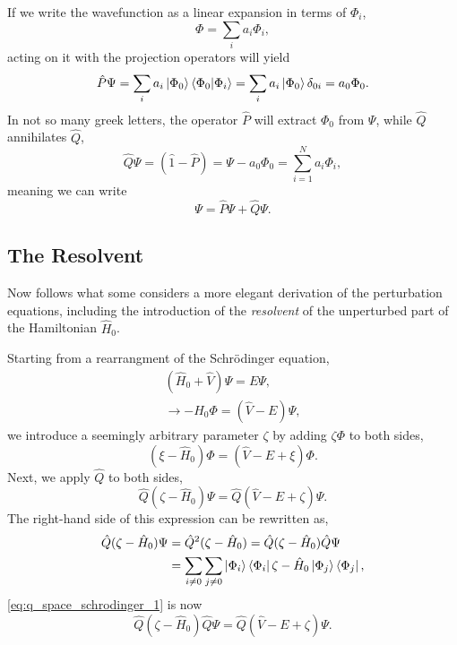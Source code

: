 If we write the wavefunction as a linear expansion in terms of $\Phi_i$,
\begin{equation}
    \Phi = \sum_i a_i \Phi_i,
\end{equation}
acting on it with the projection operators will yield
\begin{equation}
    \hat{P} \Psi = \sum_i a_i \ket{\Phi_0}\bra{\Phi_0}\ket{\Phi_i}
        = \sum_i a_i\ket{\Phi_0}\delta_{0i} = a_0\Phi_0.
\end{equation}
In not so many greek letters, the operator $\hat{P}$ will extract $\Phi_0$ from 
$\Psi$, while $\hat{Q}$ annihilates $\hat{Q}$,
\begin{equation}
    \hat{Q}\Psi = (\hat{1} - \hat{P}) = \Psi - a_0\Phi_0 
        = \sum_{i=1}^N a_i\Phi_i,
\end{equation}
meaning we can write
\begin{equation}
    \Psi = \hat{P} \Psi + \hat{Q} \Psi.
\end{equation}

\subsection{The Resolvent}
Now follows what some considers a more elegant derivation of the perturbation equations,
including the introduction of the \emph{resolvent} of the unperturbed part of the Hamiltonian
$\hat{H}_0$.

Starting from a rearrangment of the Schrödinger equation,
\begin{equation}
    \begin{gathered}
        (\hat{H}_0 + \hat{V})\Psi = E\Psi, \\
        \to -\hat{H}_0 \Phi = (\hat{V} - E)\Psi,
    \end{gathered}
\end{equation}
we introduce a seemingly arbitrary parameter $\zeta$ by adding $\zeta\Phi$ to both sides,
\begin{equation}
    (\xi - \hat{H}_0)\Phi = (\hat{V} - E + \xi)\Phi.
\end{equation}
Next, we apply $\hat{Q}$ to both sides,
\begin{equation}
    \label{eq:q_space_schrodinger_1} 
    \hat{Q}(\zeta - \hat{H}_0)\Psi = \hat{Q}(\hat{V} - E + \zeta)\Psi.
\end{equation}
The right-hand side of this expression can be rewritten as,
\begin{equation}
    \begin{aligned}
    \hat{Q}(\zeta - \hat{H}_0)\Psi &= \hat{Q}^2(\zeta - \hat{H}_0)
        = \hat{Q}(\zeta - \hat{H}_0)\hat{Q}\Psi \\
        &= \sum_{i \neq 0} \sum_{j \neq 0} \ket{\Phi_i} \bra{\Phi_i}
            \zeta - \hat{H}_0 \ket{\Phi_j} \bra{\Phi_j},
    \end{aligned}
\end{equation}
\autoref{eq:q_space_schrodinger_1} is now 
\begin{equation}
    \label{eq:q_space_schrodinger_2}
    \hat{Q}(\zeta - \hat{H}_0)\hat{Q}\Psi = \hat{Q}(\hat{V} - E + \zeta)\Psi.
\end{equation}

